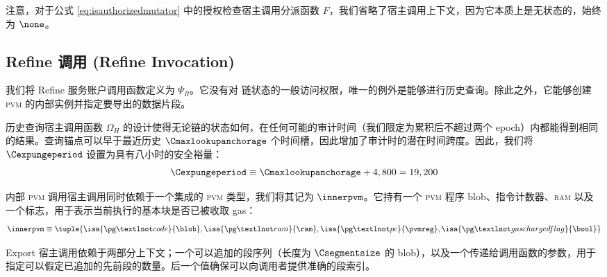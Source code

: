 注意，对于公式 \ref{eq:isauthorizedmutator} 中的授权检查宿主调用分派函数 $F$，我们省略了宿主调用上下文，因为它本质上是无状态的，始终为 $\none$。

\subsection{Refine 调用 (Refine Invocation)}\label{sec:refineinvocation}

我们将 Refine 服务账户调用函数定义为 $\Psi_R$。它没有对 \Jam 链状态的一般访问权限，唯一的例外是能够进行历史查询。除此之外，它能够创建 \textsc{pvm} 的内部实例并指定要导出的数据片段。

历史查询宿主调用函数 $\Omega_H$ 的设计使得无论链的状态如何，在任何可能的审计时间（我们限定为累积后不超过两个 epoch）内都能得到相同的结果。查询锚点可以早于最近历史 $\Cmaxlookupanchorage$ 个时间槽，因此增加了审计时的潜在时间跨度。因此，我们将 $\Cexpungeperiod$ 设置为具有八小时的安全裕量：
\begin{equation}
  \Cexpungeperiod \equiv \Cmaxlookupanchorage + 4,800 = 19,200
\end{equation}


内部 \textsc{pvm} 调用宿主调用同时依赖于一个集成的 \textsc{pvm} 类型，我们将其记为 $\innerpvm$。它持有一个 \textsc{pvm} 程序 blob、指令计数器、\textsc{ram} 以及一个标志，用于表示当前执行的基本块是否已被收取 gas：
\begin{equation}\label{eq:innerpvm}
  \innerpvm \equiv \tuple{\isa{\pg¬code}{\blob}, \isa{\pg¬ram}{\ram}, \isa{\pg¬pc}{\pvmreg}, \isa{\pg¬gaschargedflag}{\bool}}
\end{equation}

Export 宿主调用依赖于两部分上下文；一个可以追加的段序列（长度为 $\Csegmentsize$ 的 blob），以及一个传递给调用函数的参数，用于指定可以假定已追加的先前段的数量。后一个值确保可以向调用者提供准确的段索引。

